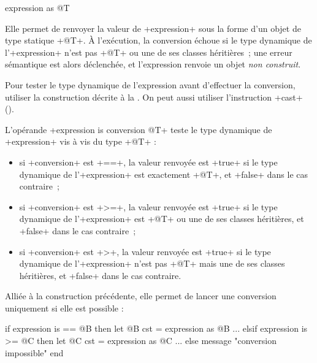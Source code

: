\begin{galgasbox}
expression as @T
\end{galgasbox}

Elle permet de renvoyer la valeur de \ggs+expression+ sous la forme d'un objet de type statique \ggs+@T+. À l'exécution, la conversion échoue si le type dynamique de l'\ggs+expression+ n'est pas \ggs+@T+ ou une de ses classes héritières~; une erreur sémantique est alors déclenchée, et l'expression renvoie un objet \emph{non construit}.

Pour tester le type dynamique de l'expression avant d'effectuer la conversion, utiliser la construction décrite à la . On peut aussi utiliser l'instruction \ggs+cast+ ().








L'opérande \ggs+expression is conversion @T+ teste le type dynamique de \ggs+expression+ vis à vis du type \ggs+@T+ :
\begin{itemize}
\item si \ggs+conversion+ est \ggs+==+, la valeur renvoyée est \ggs+true+ si le type dynamique de l'\ggs+expression+ est exactement \ggs+@T+, et \ggs+false+ dans le cas contraire~;
\item si \ggs+conversion+ est  \ggs+>=+, la valeur renvoyée est \ggs+true+ si le type dynamique de l'\ggs+expression+ est \ggs+@T+ ou une de ses classes héritières, et \ggs+false+ dans le cas contraire~;
\item si \ggs+conversion+ est  \ggs+>+, la valeur renvoyée est \ggs+true+ si le type dynamique de l'\ggs+expression+ n'est pas \ggs+@T+ mais une de ses classes héritières, et \ggs+false+ dans le cas contraire.
\end{itemize}



Alliée à la construction précédente, elle permet de lancer une conversion uniquement si elle est possible :

\begin{galgas}
if expression is == @B then
  let @B cst = expression as @B
  ...
elsif expression is >= @C then
  let @C cst = expression as @C
  ...
else
  message "conversion impossible"
end
\end{galgas}





